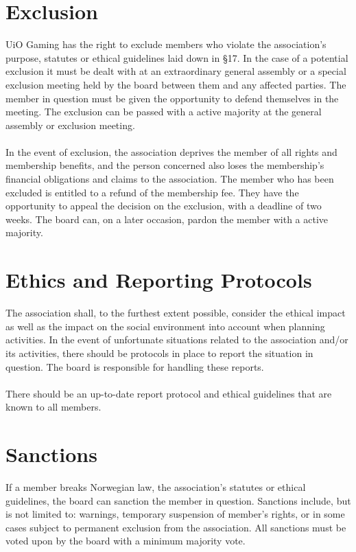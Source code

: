 \documentclass[12pt,a4paper,norsk]{article}
\begin{document}
\section{Exclusion}

UiO Gaming has the right to exclude members who violate the association's purpose, statutes or ethical guidelines laid down in §17. In the case of a potential exclusion it must be dealt with at an extraordinary general assembly or a special exclusion meeting held by the board between them and any affected parties. The member in question must be given the opportunity to defend themselves in the meeting. The exclusion can be passed with a  active majority at the general assembly or exclusion meeting. 
\\
\\
In the event of exclusion, the association deprives the member of all rights and membership benefits, and the person concerned also loses the membership's financial obligations and claims to the association. The member who has been excluded is entitled to a refund of the membership fee. They have the opportunity to appeal the decision on the exclusion, with a deadline of two weeks. The board can, on a later occasion, pardon the member with a  active majority.



\section{Ethics and Reporting Protocols}

The association shall, to the furthest extent possible, consider the ethical impact as well as the impact on the social environment into account when planning activities. In the event of unfortunate situations related to the association and/or its activities, there should be protocols in place to report the situation in question. The board is responsible for handling these reports.
\\
\\
There should be an up-to-date report protocol and ethical guidelines that are known to all members.



\section{Sanctions}

If a member breaks Norwegian law, the association's statutes or ethical guidelines, the board can sanction the member in question. Sanctions include, but is not limited to: warnings, temporary suspension of member's rights, or in some cases subject to permanent exclusion from the association. All sanctions must be voted upon by the board with a minimum  majority vote.
\end{document}

